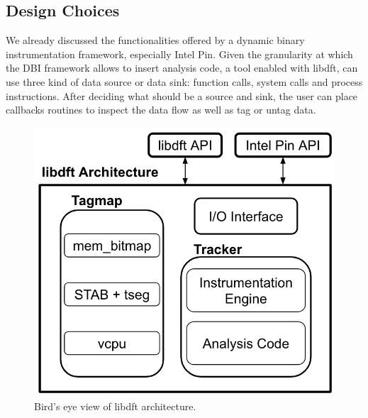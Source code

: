 \documentclass[LaM,binding=0.6cm]{sapthesis}
\begin{document}
\subsection{Design Choices}
We already discussed the functionalities offered by a dynamic binary instrumentation framework, especially Intel Pin. Given the granularity at which the DBI framework allows to insert analysis code, a tool enabled with libdft, can use three kind of data source or data sink: function calls, system calls and process instructions. After deciding what should be a source and sink, the user can place callbacks routines to inspect the data flow as well as tag or untag data.

\begin{figure}[h!]
\centering
\includegraphics[scale=.6]{images/techn9}
\caption{Bird's eye view of libdft architecture.}
\end{figure}
\end{document}
